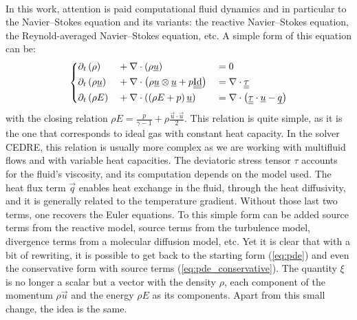     \paragraph{}
    In this work, attention is paid  computational fluid dynamics and in particular to  the Navier--Stokes equation and its variants: the reactive Navier--Stokes equation, the Reynold-averaged Navier--Stokes equation, etc.
    A simple form of this equation can be:
    \begin{equation}\label{eq:ns}
      \left\{\begin{aligned}
        &\partial_t\left(\rho         \right) &&+ \nabla\cdot\left( \rho \underline{u} \right) &&= 0 \\
        &\partial_t\left(\rho \underline{u} \right) &&+ \nabla\cdot\left( \rho \underline{u} \otimes \underline{u} + p \underline{\underline{\operatorname{Id}}} \right) &&= \nabla\cdot \underline{\underline{\tau}}\\
        &\partial_t\left( \rho E      \right) &&+ \nabla\cdot\left( \left(\rho E + p\right) \underline{u} \right) &&=
          \nabla\cdot\left( \underline{\underline{\tau}} \cdot \underline{u} - \underline{q}\right)
      \end{aligned}\right.
    \end{equation}
    with the closing relation $\rho E = \frac{p}{\gamma - 1} + \rho\frac{\vec{u} \cdot \vec{u}}{2}$.
    This relation is quite simple, as it is the one that corresponds to ideal gas with constant heat capacity.
    In the solver CEDRE, this relation is usually more complex as we are working with multifluid flows and with variable heat capacities.
    The deviatoric stress tensor $\tau$ accounts for the fluid's viscosity, and its computation depends on the model used.
    The heat flux term $\vec{q}$ enables heat exchange in the fluid, through the heat diffusivity, and it is generally related to the temperature gradient.
    Without those last two terms, one recovers the Euler equations.
    To this simple form can be added source terms from the reactive model, source terms from the turbulence model, divergence terms from a molecular diffusion model, etc.
    Yet it is clear that with a bit of rewriting, it is possible to get back to the starting form (\ref{eq:pde}) and even the conservative form with source terms (\ref{eq:pde_conservative}).
    The quantity $\xi$ is no longer a scalar but a vector with the density $\rho$, each component of the momentum $\rho\vec{u}$ and the energy $\rho E$ as its components.
    Apart from this small change, the idea is the same.

